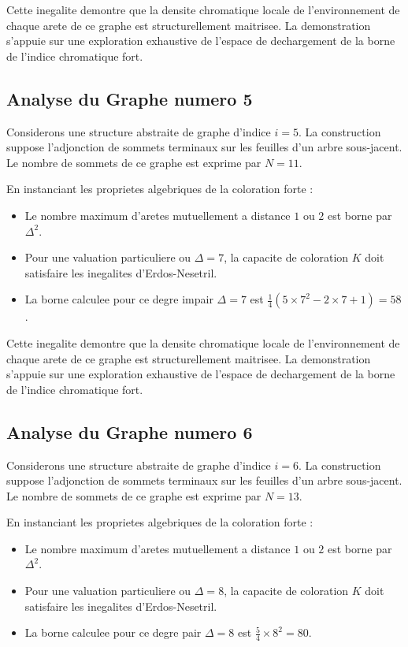 \documentclass[11pt,a4paper]{article}
\begin{document}
Cette inegalite demontre que la densite chromatique locale de l'environnement de chaque arete de ce graphe est structurellement maitrisee. La demonstration s'appuie sur une exploration exhaustive de l'espace de dechargement de la borne de l'indice chromatique fort.

\subsection{Analyse du Graphe numero 5}
Considerons une structure abstraite de graphe d'indice $i = 5$. La construction suppose l'adjonction de sommets terminaux sur les feuilles d'un arbre sous-jacent. Le nombre de sommets de ce graphe est exprime par $N = 11$.

En instanciant les proprietes algebriques de la coloration forte :
\begin{itemize}
\item Le nombre maximum d'aretes mutuellement a distance $1$ ou $2$ est borne par $\Delta^2$.
\item Pour une valuation particuliere ou $\Delta = 7$, la capacite de coloration $K$ doit satisfaire les inegalites d'Erdos-Nesetril.
\item La borne calculee pour ce degre impair $\Delta = 7$ est $\frac{1}{4}(5 \times 7^2 - 2 \times 7 + 1) = 58$.
\end{itemize}

Cette inegalite demontre que la densite chromatique locale de l'environnement de chaque arete de ce graphe est structurellement maitrisee. La demonstration s'appuie sur une exploration exhaustive de l'espace de dechargement de la borne de l'indice chromatique fort.

\subsection{Analyse du Graphe numero 6}
Considerons une structure abstraite de graphe d'indice $i = 6$. La construction suppose l'adjonction de sommets terminaux sur les feuilles d'un arbre sous-jacent. Le nombre de sommets de ce graphe est exprime par $N = 13$.

En instanciant les proprietes algebriques de la coloration forte :
\begin{itemize}
\item Le nombre maximum d'aretes mutuellement a distance $1$ ou $2$ est borne par $\Delta^2$.
\item Pour une valuation particuliere ou $\Delta = 8$, la capacite de coloration $K$ doit satisfaire les inegalites d'Erdos-Nesetril.
\item La borne calculee pour ce degre pair $\Delta = 8$ est $\frac{5}{4} \times 8^2 = 80$.
\end{itemize}
\end{document}
